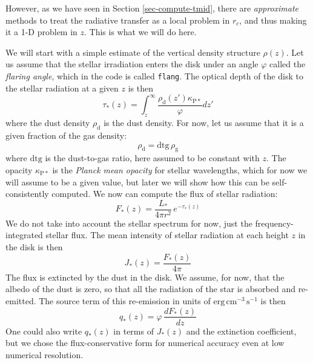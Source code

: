 \documentclass{book}
\newcommand{\code}[1]{{\small\tt #1}}
\begin{document}
However, as we have seen in Section \ref{sec-compute-tmid}, there are {\em
  approximate} methods to treat the radiative transfer as a local problem in
$r_c$, and thus making it a 1-D problem in $z$. This is what we will do here.

We will start with a simple estimate of the vertical density structure
$\rho(z)$. Let us assume that the stellar irradiation enters the disk under an angle
$\varphi$ called the {\em flaring angle}, which in the code is called
\code{flang}. The optical depth of the disk to the stellar radiation at a given
$z$ is then
\begin{equation}
\tau_{*}(z) = \int_z^\infty \frac{\rho_{\mathrm{d}}(z')\kappa_{\mathrm{P*}}}{\varphi}dz'
\end{equation}
where the dust density $\rho_{\mathrm{d}}$ is the dust density. For now, let us
assume that it is a given fraction of the gas density:
\begin{equation}
\rho_{\mathrm{d}} = \mathrm{dtg}\,\rho_{\mathrm{g}}
\end{equation}
where $\mathrm{dtg}$ is the dust-to-gas ratio, here assumed to be constant with
$z$. The opacity $\kappa_{\mathrm{P*}}$ is the {\em Planck mean opacity} for
stellar wavelengths, which for now we will assume to be a given value, but later
we will show how this can be self-consistently computed. We now can compute the
flux of stellar radiation:
\begin{equation}\label{eq-irrad-flux-flang}
F_{*}(z) = \frac{L_{*}}{4\pi r^2}\,e^{-\tau_{*}(z)}
\end{equation}
We do not take into account the stellar spectrum for now, just the
frequency-integrated stellar flux. The mean intensity of stellar radiation
at each height $z$ in the disk is then
\begin{equation}
J_{*}(z) = \frac{F_{*}(z)}{4\pi}
\end{equation}
The flux is extincted by the dust in the disk. We assume, for now, that the
albedo of the dust is zero, so that all the radiation of the star is absorbed
and re-emitted. The source term of this re-emission in units of $\mathrm{erg}\,\mathrm{cm}^{-3}
\,\mathrm{s}^{-1}$ is then
\begin{equation}
q_{*}(z) = \varphi\,\frac{dF_{*}(z)}{dz}
\end{equation}
One could also write $q_{*}(z)$ in terms of $J_{*}(z)$ and the extinction coefficient,
but we chose the flux-conservative form for numerical accuracy even at low numerical
resolution.
\end{document}
